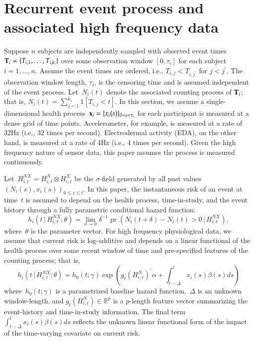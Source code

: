\documentclass[12pt]{amsart}
\def\pr{\mathop{\text{pr}}\nolimits}
\def\pr{\mathop{\text{pr}}\nolimits}
\def\given{\, | \,}
\def\Given{\, \big | \,}
\def\bfx{{\bf x}}
\def\bfT{{\bf T}}
\begin{document}
\section{Recurrent event process and associated high frequency data}
\label{section:modeloverview}

Suppose $n$ subjects are independently sampled with observed event times~$\bfT_{i} = \{ T_{i,1}, \ldots, T_{i,k_i}\}$ over some observation window $[0, \tau_i]$ for each subject $i = 1,\ldots, n$.  Assume the event times are ordered, i.e., $T_{i,j} < T_{i,j^\prime}$ for $j < j^\prime$. The observation window length, $\tau_i$, is the censoring time and is assumed independent of the event process. Let~$N_{i} (t)$ denote the associated counting process of $\bfT_{i}$; that is, $N_i (t) = \sum_{j=1}^{k_i} 1 [ T_{i,j} < t ]$. In this section, we assume a single-dimensional health process~$\bfx_i = \{ x_i (s) \}_{0 < s < \tau_i}$ for each participant is measured at a dense grid of time points.  Accelerometer, for example, is measured at a rate of 32Hz (i.e., $32$ times per second). Electrodermal activity (EDA), on the other hand, is measured at a rate of 4Hz (i.e., 4 times per second).  Given the high frequency nature of sensor data, this paper assumes the process is measured continuously.

Let~$H_{i,t}^{NX} = H_{i,t}^{N} \otimes H_{i,t}^{X}$ be the $\sigma$-field generated by all past values~$(N_i (s), x_i (s))_{0 \leq s \leq t}$. In this paper, the instantaneous risk of an event at time~$t$ is assumed to depend on the health process, time-in-study, and the event history through a fully parametric conditional hazard function:
\begin{equation}
\label{eq:hazard}
h_i \left( t \Given H_{i,t}^{NX} ; \theta \right) =
\lim_{\delta \to 0} \delta^{-1} \pr \left( N_i(t+\delta) - N_i(t) > 0
  \given H_{i,t}^{NX} \right),
\end{equation}
where~$\theta$ is the parameter vector. For high frequency physiological data, we assume that current risk is log-additive and depends on a linear functional of the health process over some recent window of time and pre-specified features of the counting process; that is,
\begin{equation}
\label{eq:hazardlinear}
h_i \left( t \given  H_{i,t}^{NX} ; \theta \right) =
h_0 (t; \gamma) \exp \left( g_t \left( H_{i,t}^{N} \right)^{\prime} \alpha
  + \int_{t-\Delta}^t x_i (s) \beta(s) ds  \right)
\end{equation}
where~$h_0(t;\gamma)$ is a parametrized baseline hazard function,~$\Delta$ is an unknown window-length, and $g_t( H_{i,t}^N ) \in \mathbb{R}^p$ is a $p$-length feature vector summarizing the event-history and time-in-study information. The final term~$\int_{t-\Delta}^t x_i(s) \beta(s) ds$ reflects the unknown linear functional form of the impact of the time-varying covariate on current risk.
\end{document}
